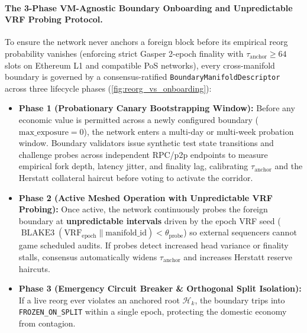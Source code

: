 \documentclass[a4paper,11pt,twoside,parskip=half-,headings=small]{scrartcl}
\newcommand{\code}[1]{\texttt{#1}}
\begin{document}
\paragraph{The 3-Phase VM-Agnostic Boundary Onboarding and Unpredictable VRF Probing Protocol.}
To ensure the network never anchors a foreign block before its empirical reorg probability vanishes (enforcing strict Gasper 2-epoch finality with $\tau_{\text{anchor}} \ge 64$ slots on Ethereum L1 and compatible PoS networks), every cross-manifold boundary is governed by a consensus-ratified \code{BoundaryManifoldDescriptor} across three lifecycle phases (\cref{fig:reorg_vs_onboarding}):
\begin{itemize}[nosep]
  \item \textbf{Phase 1 (Probationary Canary Bootstrapping Window):} Before any economic value is permitted across a newly configured boundary ($\text{max\_exposure} = 0$), the network enters a multi-day or multi-week probation window. Boundary validators issue synthetic test state transitions and challenge probes across independent RPC/p2p endpoints to measure empirical fork depth, latency jitter, and finality lag, calibrating $\tau_{\text{anchor}}$ and the Herstatt collateral haircut before voting to activate the corridor.
  \item \textbf{Phase 2 (Active Meshed Operation with Unpredictable VRF Probing):} Once active, the network continuously probes the foreign boundary at \textbf{unpredictable intervals} driven by the epoch VRF seed ($\operatorname{BLAKE3}(\text{VRF}_{\text{epoch}} \parallel \text{manifold\_id}) < \theta_{\text{probe}}$) so external sequencers cannot game scheduled audits. If probes detect increased head variance or finality stalls, consensus automatically widens $\tau_{\text{anchor}}$ and increases Herstatt reserve haircuts.
  \item \textbf{Phase 3 (Emergency Circuit Breaker \& Orthogonal Split Isolation):} If a live reorg ever violates an anchored root $\mathcal{H}_k$, the boundary trips into \code{FROZEN\_ON\_SPLIT} within a single epoch, protecting the domestic economy from contagion.
\end{itemize}
\end{document}
